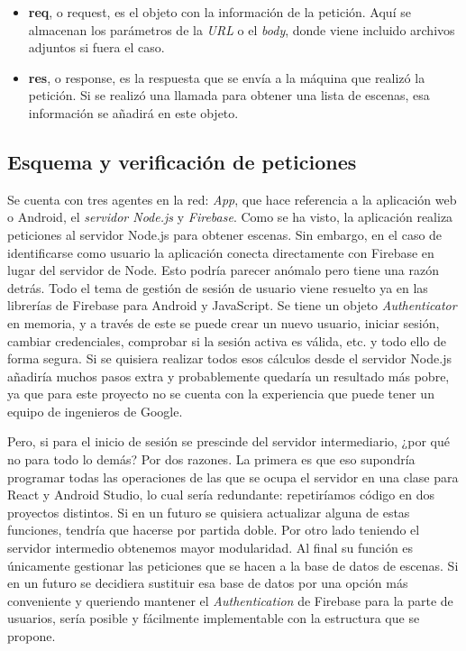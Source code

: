 \begin{itemize}
    \item \textbf{req}, o request, es el objeto con la información de la petición. Aquí se almacenan los parámetros de la \textit{URL} o el \textit{body}, donde viene incluido archivos adjuntos si fuera el caso.
    \item \textbf{res}, o response, es la respuesta que se envía a la máquina que realizó la petición. Si se realizó una llamada para obtener una lista de escenas, esa información se añadirá en este objeto.
\end{itemize}

\subsection{Esquema y verificación de peticiones}

Se cuenta con tres agentes en la red: \textit{App}, que hace referencia a la aplicación web o Android, el \textit{servidor Node.js} y \textit{Firebase}. Como se ha visto, la aplicación realiza peticiones al servidor Node.js para obtener escenas. Sin embargo, en el caso de identificarse como usuario la aplicación conecta directamente con Firebase en lugar del servidor de Node. Esto podría parecer anómalo pero tiene una razón detrás. Todo el tema de gestión de sesión de usuario viene resuelto ya en las librerías de Firebase para Android y JavaScript. Se tiene un objeto \textit{Authenticator} en memoria, y a través de este se puede crear un nuevo usuario, iniciar sesión, cambiar credenciales, comprobar si la sesión activa es válida, etc. y todo ello de forma segura. Si se quisiera realizar todos esos cálculos desde el servidor Node.js añadiría muchos pasos extra y probablemente quedaría un resultado más pobre, ya que para este proyecto no se cuenta con la experiencia que puede tener un equipo de ingenieros de Google.

Pero, si para el inicio de sesión se prescinde del servidor intermediario, ¿por qué no para todo lo demás? Por dos razones. La primera es que eso supondría programar todas las operaciones de las que se ocupa el servidor en una clase para React y Android Studio, lo cual sería redundante: repetiríamos código en dos proyectos distintos. Si en un futuro se quisiera actualizar alguna de estas funciones, tendría que hacerse por partida doble. Por otro lado teniendo el servidor intermedio obtenemos mayor modularidad. Al final su función es únicamente gestionar las peticiones que se hacen a la base de datos de escenas. Si en un futuro se decidiera sustituir esa base de datos por una opción más conveniente y queriendo mantener el \textit{Authentication} de Firebase para la parte de usuarios, sería posible y fácilmente implementable con la estructura que se propone.

